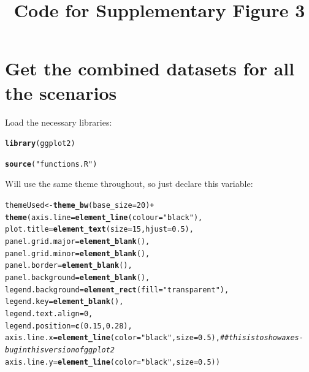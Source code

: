 \documentclass{article}\usepackage[]{graphicx}\usepackage[]{color}
\title{Code for Supplementary Figure 3}
\makeatletter
\newcommand{\hlnum}[1]{\textcolor[rgb]{0.686,0.059,0.569}{#1}}%
\newcommand{\hlstr}[1]{\textcolor[rgb]{0.192,0.494,0.8}{#1}}%
\newcommand{\hlcom}[1]{\textcolor[rgb]{0.678,0.584,0.686}{\textit{#1}}}%
\newcommand{\hlopt}[1]{\textcolor[rgb]{0,0,0}{#1}}%
\newcommand{\hlstd}[1]{\textcolor[rgb]{0.345,0.345,0.345}{#1}}%
\newcommand{\hlkwb}[1]{\textcolor[rgb]{0.69,0.353,0.396}{#1}}%
\newcommand{\hlkwc}[1]{\textcolor[rgb]{0.333,0.667,0.333}{#1}}%
\newcommand{\hlkwd}[1]{\textcolor[rgb]{0.737,0.353,0.396}{\textbf{#1}}}%
\newenvironment{kframe}{%
 \def\at@end@of@kframe{}%
 \ifinner\ifhmode%
  \def\at@end@of@kframe{\end{minipage}}%
  \begin{minipage}{\columnwidth}%
 \fi\fi%
 \def\FrameCommand##1{\hskip\@totalleftmargin \hskip-\fboxsep
 \colorbox{shadecolor}{##1}\hskip-\fboxsep
     \hskip-\linewidth \hskip-\@totalleftmargin \hskip\columnwidth}%
 \MakeFramed {\advance\hsize-\width
   \@totalleftmargin\z@ \linewidth\hsize
   \@setminipage}}%
 {\par\unskip\endMakeFramed%
 \at@end@of@kframe}
\newenvironment{knitrout}{}{} %
\makeatother
\begin{document}
\maketitle



\section{Get the combined datasets for all the scenarios}

Load the necessary libraries:
\begin{knitrout}
\color{fgcolor}\begin{kframe}
\begin{alltt}
\hlkwd{library}\hlstd{(ggplot2)}

\hlkwd{source}\hlstd{(}\hlstr{"functions.R"}\hlstd{)}
\end{alltt}
\end{kframe}
\end{knitrout}

Will use the same theme throughout, so just declare this variable:
\begin{knitrout}
\color{fgcolor}\begin{kframe}
\begin{alltt}
\hlstd{themeUsed} \hlkwb{<-} \hlkwd{theme_bw}\hlstd{(}\hlkwc{base_size} \hlstd{=} \hlnum{20}\hlstd{)} \hlopt{+}
  \hlkwd{theme}\hlstd{(}\hlkwc{axis.line} \hlstd{=} \hlkwd{element_line}\hlstd{(}\hlkwc{colour} \hlstd{=} \hlstr{"black"}\hlstd{),}
        \hlkwc{plot.title} \hlstd{=} \hlkwd{element_text}\hlstd{(}\hlkwc{size} \hlstd{=} \hlnum{15}\hlstd{,} \hlkwc{hjust}\hlstd{=}\hlnum{0.5}\hlstd{),}
        \hlkwc{panel.grid.major} \hlstd{=} \hlkwd{element_blank}\hlstd{(),}
        \hlkwc{panel.grid.minor} \hlstd{=} \hlkwd{element_blank}\hlstd{(),}
        \hlkwc{panel.border} \hlstd{=} \hlkwd{element_blank}\hlstd{(),}
        \hlkwc{panel.background} \hlstd{=} \hlkwd{element_blank}\hlstd{(),}
        \hlkwc{legend.background} \hlstd{=} \hlkwd{element_rect}\hlstd{(}\hlkwc{fill}\hlstd{=}\hlstr{"transparent"}\hlstd{),}
        \hlkwc{legend.key} \hlstd{=} \hlkwd{element_blank}\hlstd{(),}
        \hlkwc{legend.text.align} \hlstd{=} \hlnum{0}\hlstd{,}
        \hlkwc{legend.position} \hlstd{=} \hlkwd{c}\hlstd{(}\hlnum{0.15}\hlstd{,}\hlnum{0.28}\hlstd{),}
        \hlkwc{axis.line.x} \hlstd{=} \hlkwd{element_line}\hlstd{(}\hlkwc{color}\hlstd{=}\hlstr{"black"}\hlstd{,} \hlkwc{size} \hlstd{=} \hlnum{0.5}\hlstd{),} \hlcom{##this is to show axes - bug in this version of ggplot2}
        \hlkwc{axis.line.y} \hlstd{=} \hlkwd{element_line}\hlstd{(}\hlkwc{color}\hlstd{=}\hlstr{"black"}\hlstd{,} \hlkwc{size} \hlstd{=} \hlnum{0.5}\hlstd{))}
\end{alltt}
\end{kframe}
\end{knitrout}
\end{document}
